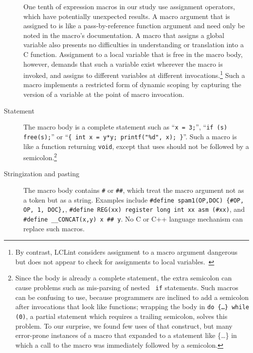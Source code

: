 \documentclass[11pt]{article}
\begin{document}
\begin{description}
One tenth of expression macros in our study use assignment operators, which
have potentially unexpected results.  A macro argument that is assigned to
is like a pass-by-reference function argument and need only be noted in the
macro's documentation.  A macro that assigns a global variable also
presents no difficulties in understanding or translation into a C function.
Assignment to a local variable that is free in the macro body, however,
demands that such a variable exist wherever the macro is invoked, and
assigns to different variables at different invocations.\footnote{By
  contrast, LCLint considers assignment to a macro argument dangerous but
  does not appear to check for assignments to local
  variables.~\cite{Evans:LCLint}} Such a macro implements a restricted form
of dynamic scoping by capturing the version of a variable at the point of
macro invocation.


\item[Statement]  The macro body is a complete statement such as
  ``{\tt x = 3;}'', ``{\tt if (s) free(s);}'' or ``{\tt \verb|{| int x =
    y*y; printf("\%d", x); \verb|}|}''.  Such a macro is like a function
    returning {\tt void}, except that uses should not be followed by a
    semicolon.\footnote{Since the body is already a complete statement, the
      extra semicolon can cause problems such as mis-parsing of nested {\tt
      if} statements.  Such macros can be confusing to use, because
    programmers are inclined to add a semicolon after invocations that look
    like functions; wrapping the body in {\tt do \{\ldots\} while (0)}, a
    partial statement which requires a trailing semicolon, solves this
    problem.  To our surprise, we found few uses of that construct, but
    many error-prone instances of a macro that expanded to a statement like
    \{\ldots\} in which a call to the macro was immediately followed by a
    semicolon.}

\item[Stringization and pasting]  The macro body contains {\tt \#} or
  {\tt \#\#}, which treat the macro argument not as a token but as a
  string.  Examples include {\tt \#define spam1(OP,DOC) \verb|{|\#OP, OP,
    1, DOC\verb|}|,}, {\tt \#define REG(xx) register long int xx asm
    (\#xx)}, and {\tt \#define \verb|__CONCAT|(x,y) x \#\# y}.  No C or C++
  language mechanism can replace such macros.


\end{description}
\end{document}

